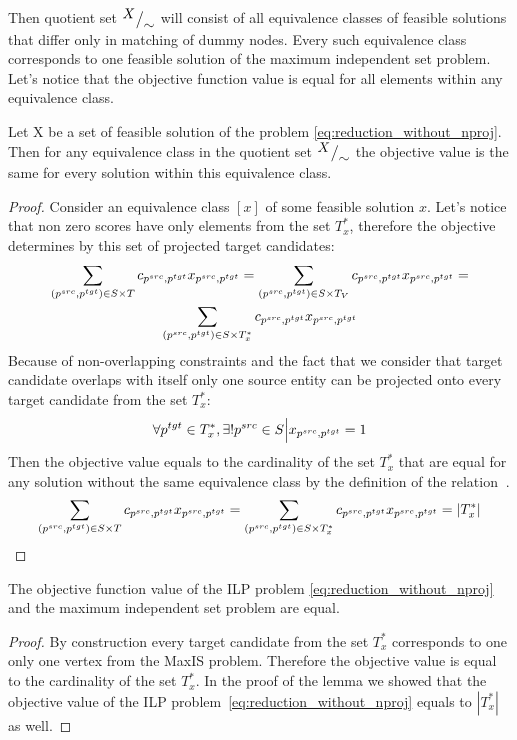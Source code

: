 Then quotient set \( {^{\textstyle X}\big/_{\textstyle \sim}} \) will consist of all equivalence classes of feasible solutions
that differ only in matching of dummy nodes. Every such equivalence class corresponds to one feasible solution of
the maximum independent set problem. Let's notice that the objective function value is equal for all
elements within any equivalence class.
\begin{lemma}
    Let X be a set of feasible solution of the problem \eqref{eq:reduction_without_nproj}. Then
    for any equivalence class in the quotient set \( {^{\textstyle X}\big/_{\textstyle \sim}} \) the objective
    value is the same for every solution within this equivalence class.
\end{lemma}
\begin{proof}
    Consider an equivalence class \( [x] \) of some feasible solution \( x \).
    Let's notice that non zero scores have only elements from the set \( T^*_x \),
    therefore the objective determines by this set of projected target candidates:
    \begin{multline*}
        \sum\limits_{(p^{src}, p^{tgt}) \in S \times T} c_{p^{src}, p^{tgt}} x_{p^{src}, p^{tgt}} =
        \sum\limits_{(p^{src}, p^{tgt}) \in S \times T_V} c_{p^{src}, p^{tgt}} x_{p^{src}, p^{tgt}} = \\
        \sum\limits_{(p^{src}, p^{tgt}) \in S \times T^{*}_{x}} c_{p^{src}, p^{tgt}} x_{p^{src}, p^{tgt}}
    \end{multline*}
    Because of non-overlapping constraints and the fact that we consider that target candidate overlaps with
    itself only one source entity can be projected onto every target candidate from the set \( T_x^* \):
    \[
        \forall p^{tgt} \in T^*_x, \exists! p^{src} \in S \Big| x_{p^{src}, p^{tgt}} = 1
    \]
    Then the objective value equals to the cardinality of the set \( T^*_x \) that are equal for
    any solution without the same equivalence class by the definition of the relation \( ~ \).
    \[
        \sum\limits_{(p^{src}, p^{tgt}) \in S \times T} c_{p^{src}, p^{tgt}} x_{p^{src}, p^{tgt}} =
        \sum\limits_{(p^{src}, p^{tgt}) \in S \times T^{*}_{x}} c_{p^{src}, p^{tgt}} x_{p^{src}, p^{tgt}} =
        |T_x^*|
    \]
\end{proof}
\begin{corollary} \label{col:maxis_and_ilp_objective_equal}
    The objective function value of the ILP problem \eqref{eq:reduction_without_nproj} and the maximum independent
    set problem are equal.
\end{corollary}
\begin{proof}
    By construction every target candidate from the set \( T^*_x \) corresponds to one only one vertex
    from the MaxIS problem. Therefore the objective value is equal to the cardinality of the set \(  T^*_x \).
    In the proof of the lemma we showed that the objective value of the ILP problem~\eqref{eq:reduction_without_nproj}
    equals to \( | T^*_x| \) as well.
\end{proof}


